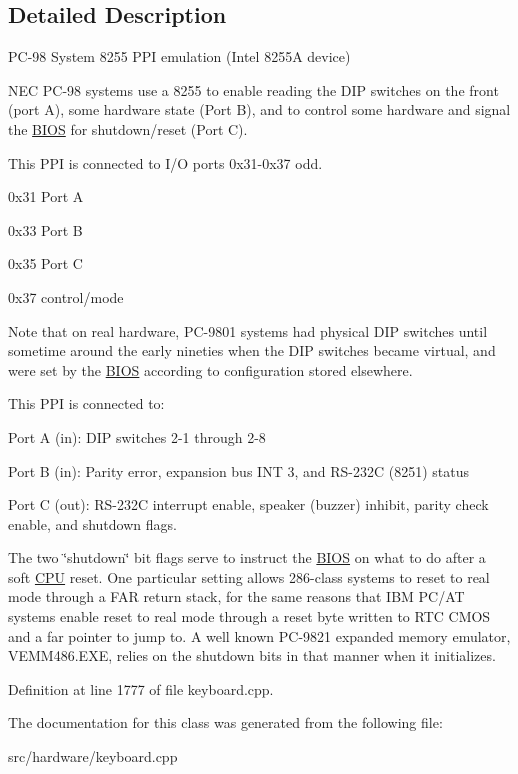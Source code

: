 \subsection{Detailed Description}
P\-C-\/98 System 8255 P\-P\-I emulation (Intel 8255\-A device) 

N\-E\-C P\-C-\/98 systems use a 8255 to enable reading the D\-I\-P switches on the front (port A), some hardware state (Port B), and to control some hardware and signal the \hyperlink{classBIOS}{B\-I\-O\-S} for shutdown/reset (Port C).

This P\-P\-I is connected to I/\-O ports 0x31-\/0x37 odd.
\begin{DoxyItemize}
\item 0x31 Port A
\item 0x33 Port B
\item 0x35 Port C
\item 0x37 control/mode
\end{DoxyItemize}

Note that on real hardware, P\-C-\/9801 systems had physical D\-I\-P switches until sometime around the early nineties when the D\-I\-P switches became virtual, and were set by the \hyperlink{classBIOS}{B\-I\-O\-S} according to configuration stored elsewhere.

This P\-P\-I is connected to\-:
\begin{DoxyItemize}
\item Port A (in)\-: D\-I\-P switches 2-\/1 through 2-\/8
\item Port B (in)\-: Parity error, expansion bus I\-N\-T 3, and R\-S-\/232\-C (8251) status
\item Port C (out)\-: R\-S-\/232\-C interrupt enable, speaker (buzzer) inhibit, parity check enable, and shutdown flags.
\end{DoxyItemize}

The two \char`\"{}shutdown\char`\"{} bit flags serve to instruct the \hyperlink{classBIOS}{B\-I\-O\-S} on what to do after a soft \hyperlink{classCPU}{C\-P\-U} reset. One particular setting allows 286-\/class systems to reset to real mode through a F\-A\-R return stack, for the same reasons that I\-B\-M P\-C/\-A\-T systems enable reset to real mode through a reset byte written to R\-T\-C C\-M\-O\-S and a far pointer to jump to. A well known P\-C-\/9821 expanded memory emulator, V\-E\-M\-M486.\-E\-X\-E, relies on the shutdown bits in that manner when it initializes. 

Definition at line 1777 of file keyboard.\-cpp.



The documentation for this class was generated from the following file\-:\begin{DoxyCompactItemize}
\item 
src/hardware/keyboard.\-cpp\end{DoxyCompactItemize}
